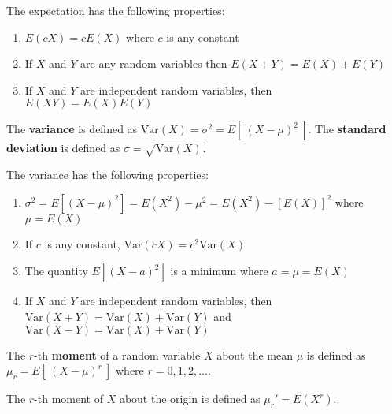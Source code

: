 \begin{samepage}
\begin{thm}
    The expectation has the following properties:

    \begin{enumerate}
        \item $E(c X) = c E(X)$ where $c$ is any constant
        \item If $X$ and $Y$ are any random variables then $E(X + Y) = E(X) + E(Y)$
        \item If $X$ and $Y$ are independent random variables, then $E(XY) = E(X)E(Y)$
    \end{enumerate}
\end{thm}
\end{samepage}

\begin{defn}
    The \textbf{variance} is defined as $\text{Var} (X) = \sigma ^2 = E[ \  (X - \mu)^2 \  ]$.
    The \textbf{standard deviation} is defined as $\sigma = \sqrt{\text{Var} (X)}$.
\end{defn}

\begin{samepage}
\begin{thm}
    The variance has the following properties:

    \begin{enumerate}
        \item $\sigma ^2 = E\left [ \left (X - \mu \right ) ^2 \right ] = E\left (X ^2\right ) - \mu ^2 = E\left (X ^2\right ) - \left [E\left (X\right )\right ] ^2$ where $\mu = E\left (X\right )$
        \item If $c$ is any constant, $\text{Var}(cX) = c^2 \text{Var}(X)$
        \item The quantity $E[ (X - a)^2 ]$ is a minimum where $a = \mu = E(X)$
        \item If $X$ and $Y$ are independent random variables, then \\ $\text{Var}(X+Y) = \text{Var}(X) + \text{Var}(Y)$ and $\text{Var}(X-Y) = \text{Var}(X) + \text{Var}(Y)$
    \end{enumerate}
\end{thm}
\end{samepage}

\begin{defn}
    The $r$-th \textbf{moment} of a random variable $X$ about the mean $\mu$ is defined as $\mu_r = E[\  (X - \mu)^r \ ]$ where $r=0, 1, 2, ...$.

    The $r$-th moment of $X$ about the origin is defined as $\mu_r ' = E(X^r)$.
\end{defn}


